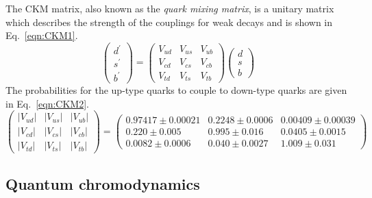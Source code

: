 

The CKM matrix, also known as the \emph{quark mixing matrix}, is a unitary matrix which describes the strength of the couplings for weak decays and is shown in Eq.~\ref{eqn:CKM1}. 
\begin{equation}
\label{eqn:CKM1}
{\begin{pmatrix}
d^{\prime }\\
s^{\prime }\\
b^{\prime }
\end{pmatrix}}
=
{\begin{pmatrix}
V_{ud}&V_{us}&V_{ub}\\
V_{cd}&V_{cs}&V_{cb}\\
V_{td}&V_{ts}&V_{tb}
\end{pmatrix}}
{\begin{pmatrix}d\\s\\b
\end{pmatrix}}
\end{equation}
The probabilities for the up-type quarks to couple to down-type quarks are given in Eq.~\ref{eqn:CKM2}.
\begin{equation}
\label{eqn:CKM2}
{\begin{pmatrix}
|V_{ud}|&|V_{us}|&|V_{ub}|\\|V_{cd}|&|V_{cs}|&|V_{cb}|\\|V_{td}|&|V_{ts}|&|V_{tb}|
\end{pmatrix}}
=
{\begin{pmatrix}0.97417\pm 0.00021 & 0.2248\pm 0.0006 & 0.00409\pm{0.00039}\\
0.220\pm 0.005 & 0.995\pm 0.016 & 0.0405\pm{0.0015}\\
0.0082\pm{0.0006} & 0.040\pm{0.0027}&1.009\pm0.031
\end{pmatrix}}
\end{equation}



\subsection{Quantum chromodynamics}

